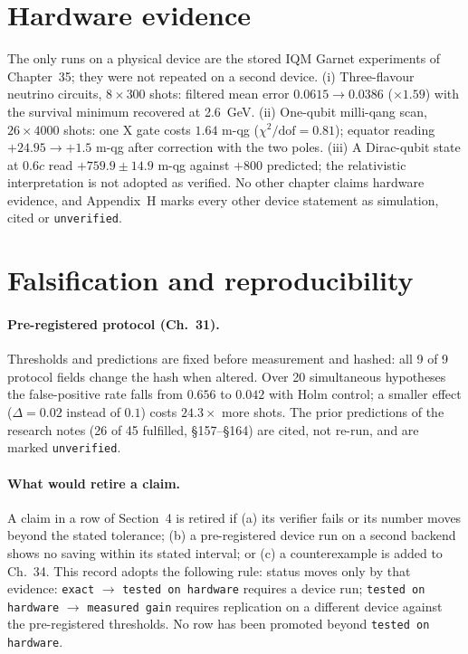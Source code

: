 \documentclass[11pt]{article}
\newcommand{\st}[1]{\texttt{#1}}
\begin{document}
\section{Hardware evidence}\label{sec:hw}
The only runs on a physical device are the stored IQM Garnet experiments of Chapter~35; they were not repeated on a second device. (i) Three-flavour neutrino circuits, $8\times300$ shots: filtered mean error $0.0615\to0.0386$ ($\times1.59$) with the survival minimum recovered at 2.6~GeV. (ii) One-qubit milli-qang scan, $26\times4000$ shots: one X gate costs $1.64$ m-qg ($\chi^2/\mathrm{dof}=0.81$); equator reading $+24.95\to+1.5$ m-qg after correction with the two poles. (iii) A Dirac-qubit state at $0.6c$ read $+759.9\pm14.9$ m-qg against $+800$ predicted; the relativistic interpretation is not adopted as verified. No other chapter claims hardware evidence, and Appendix~H marks every other device statement as simulation, cited or \st{unverified}.

\section{Falsification and reproducibility}
\paragraph{Pre-registered protocol (Ch.~31).} Thresholds and predictions are fixed before measurement and hashed: all 9 of 9 protocol fields change the hash when altered. Over 20 simultaneous hypotheses the false-positive rate falls from $0.656$ to $0.042$ with Holm control; a smaller effect ($\Delta=0.02$ instead of $0.1$) costs $24.3\times$ more shots. The prior predictions of the research notes (26 of 45 fulfilled, \S157--\S164) are cited, not re-run, and are marked \st{unverified}.
\paragraph{What would retire a claim.} A claim in a row of Section~4 is retired if (a) its verifier fails or its number moves beyond the stated tolerance; (b) a pre-registered device run on a second backend shows no saving within its stated interval; or (c) a counterexample is added to Ch.~34. This record adopts the following rule: status moves only by that evidence: \st{exact} $\to$ \st{tested on hardware} requires a device run; \st{tested on hardware} $\to$ \st{measured gain} requires replication on a different device against the pre-registered thresholds. No row has been promoted beyond \st{tested on hardware}.
\end{document}
